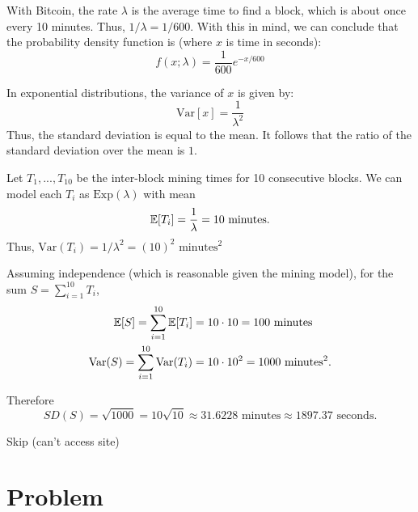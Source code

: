 \documentclass[11pt]{article}
\begin{document}
With Bitcoin, the rate $\lambda$ is the average time to find a block, which is about once every 10 minutes. Thus, $1 / \lambda = 1/600$. With this in mind, we can conclude that the probability density function is (where $x$ is time in seconds):
\begin{equation}
    f(x; \lambda) = \frac{1}{600}e^{-x/600}
\end{equation}

\begin{p}\end{p}
In exponential distributions, the variance of $x$ is given by:
\begin{equation}
    \text{Var}[x] = \frac{1}{\lambda^2}
\end{equation}
Thus, the standard deviation is equal to the mean. It follows that the ratio of the standard deviation over the mean is $1$.

\begin{p}\end{p}
Let $T_1,...,T_10$ be the inter-block mining times for 10 consecutive blocks. We can model each $T_i$ as $\text{Exp}(\lambda)$ with mean
\begin{equation}
    \mathbb{E}[T_i] = \frac{1}{\lambda} = 10 \text{ minutes}.
\end{equation}
Thus, $\text{Var}(T_i) = 1 / \lambda^2 = (10)^2 \text{ minutes}^2$

Assuming independence (which is reasonable given the mining model), for the sum $S = \sum_{i=1}^{10} T_i$,
\begin{align}
    \mathbb{E}[S] = \sum_{i=1}^{10} \mathbb{E}[T_i] &= 10 \cdot 10 = 100 \text{ minutes} \\
    \text{Var}(S) = \sum_{i=1}^{10}\text{Var}(T_i) &= 10 \cdot 10^2 = 1000 \text{ minutes}^2.
\end{align}

Therefore
\begin{equation}
    SD(S) = \sqrt{1000} = 10\sqrt{10} \approx 31.6228 \text{ minutes} \approx 1897.37 \text{ seconds}. 
\end{equation}

\begin{p}
Skip (can't access site)
\end{p}


\section{Problem}
\end{document}
